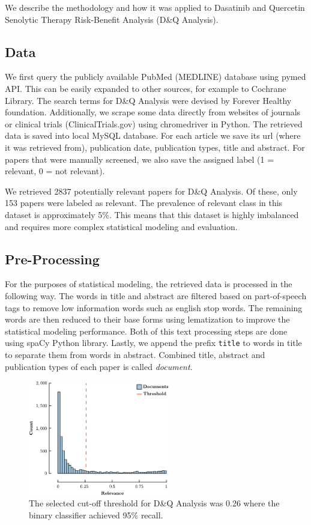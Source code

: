 \documentclass[10pt,twocolumn,letterpaper]{article}
\begin{document}
We describe the methodology and how it was applied to Dasatinib and Quercetin Senolytic Therapy Risk-Benefit Analysis (D\&Q Analysis).

\subsection{Data}
We first query the publicly available PubMed (MEDLINE) database using pymed API. This can be easily expanded to other sources, for example to Cochrane Library. The search terms for D\&Q Analysis were devised by Forever Healthy foundation. Additionally, we scrape some data directly from websites of journals or clinical trials (ClinicalTrials.gov) using chromedriver in Python. The retrieved data is saved into local MySQL database. For each article we save its url (where it was retrieved from), publication date, publication types, title and abstract. For papers that were manually screened, we also save the assigned label (1 = relevant, 0 = not relevant). 

We retrieved 2837 potentially relevant papers for D\&Q Analysis. Of these, only 153 papers were labeled as relevant. The prevalence of relevant class in this dataset is approximately 5\%. This means that this dataset is highly imbalanced and requires more complex statistical modeling and evaluation.

\subsection{Pre-Processing} 
For the purposes of statistical modeling, the retrieved data is processed in the following way. The words in title and abstract are filtered based on part-of-speech tags to remove low information words such as english stop words. The remaining words are then reduced to their base forms using lematization to improve the statistical modeling performance. Both of this text processing steps are done using spaCy Python library. Lastly, we append the prefix \texttt{title} to words in title to separate them from words in abstract. Combined title, abstract and publication types of each paper is called {\it document}.

\begin{figure}[ht]
\centering
\includegraphics[width=0.55\textwidth]{../figures/threshold-selection/threshold-selection-crop.pdf}
\caption{The selected cut-off threshold for D\&Q Analysis was 0.26 where the binary classifier achieved 95\% recall.}
\label{fig:threshold-selection}
\end{figure}
\end{document}
